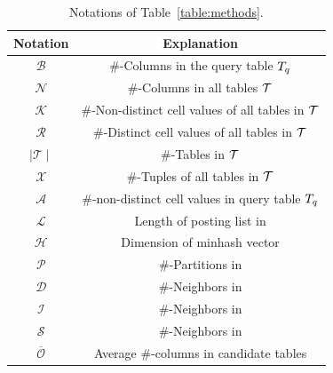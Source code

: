 \begin{table}[!ht]
	\centering
	\caption{ Notations of Table~\ref{table:methods}.}
	\begin{tabular}{|c|c|}
		\hline
		Notation & Explanation \\ \hline
		$\mathcal{B}$ & \#-Columns in the query table $T_q$  \\\hline
		$\mathcal{N}$ &\#-Columns in all tables $\mathcal{T}$ \\\hline
		$\mathcal{K}$ & \#-Non-distinct cell values of all tables in $\mathcal{T}$   \\\hline
		$\mathcal{R}$ &\#-Distinct cell values of all tables in $\mathcal{T}$ \\\hline
		$\mid \mathcal{T} \mid$ & \#-Tables in $\mathcal{T}$  \\\hline
		$\mathcal{X}$ &\#-Tuples of all tables in $\mathcal{T}$ \\\hline
		$\mathcal{A}$ & \#-non-distinct cell values in query table $T_q$  \\\hline
		
		$\mathcal{L}$ & Length of posting list in \josie  \\\hline

		$\mathcal{H}$ & Dimension of minhash vector \\\hline
		$\mathcal{P}$ & \#-Partitions in \lsh\\\hline
		$\mathcal{D}$ & \#-Neighbors in \dlll\\\hline
		$\mathcal{I}$ & \#-Neighbors in \infogather\\\hline
		$\mathcal{S}$ & \#-Neighbors in \santos\\\hline
		$\overline{\mathcal{O}}$ & Average  \#-columns in candidate tables
		\\ \hline






	
	\end{tabular}
	\label{symbol_table}
\end{table}



